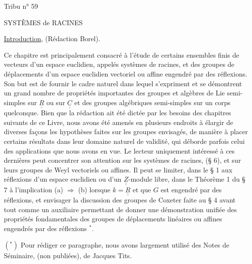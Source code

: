 \hfill Tribu n° 59

SYSTÈMES de RACINES

\uline{Introduction}, (Rédaction Borel).

Ce chapitre est principalement consacré à l'étude de certains ensembles
finis de vecteurs d'un espace euclidien, appelés systèmes de racines, et des
groupes de déplacements d'un espace euclidien vectoriel ou affine engendré par
des réflexions. Son but est de fournir le cadre naturel dans lequel s'expriment
et se démontrent un grand nombre de propriétés importantes des groupes et algèbres
de Lie semi-simples sur $\underline{\underline{R}}$ ou sur $\underline{\underline{C}}$ et des groupes algébriques semi-simples
sur un corps quelconque. Bien que la rédaction ait été dictée par les besoins
des chapitres suivants de ce Livre, nous avons été amenés en plusieurs endroits
à élargir de diverses façons les hypothèses faites sur les groupes envisagés,
de manière à placer certains résultats dans leur domaine naturel de validité,
qui déborde parfois celui des applications que nous avons en vue. Le lecteur
uniquement intéressé à ces dernières peut concentrer son attention sur les
systèmes de racines, (§ 6), et sur leurs groupes de Weyl vectoriels ou affines.
Il peut se limiter, dans le § 1 aux réflexions d'un espace euclidien ou d'un
$\underline{\underline{Z}}$-module libre, dans le Théorème 1 du § 7 à l'implication (a) $\Longrightarrow$ (b) lorsque
$k=\underline{\underline{R}}$ et que $G$ est engendré par des réflexions, et envisager la discussion des
groupes de Coxeter faite au § 4 avant tout comme un auxiliaire permettant de
donner une démonstration unifiée des propriétés fondamentales des groupes de
déplacements linéaires ou affines engendrés par des réflexions $^{*}$.


$(^{*})$ Pour rédiger ce paragraphe, nous avons largement utilisé des Notes de
Séminaire, (non publiées), de Jacques Tits.
